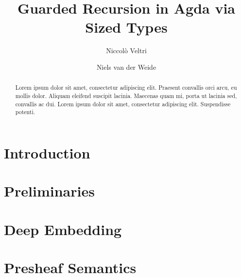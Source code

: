\documentclass[a4paper,UKenglish,cleveref, autoref,numberwithinsect]{lipics-v2019}
\title{Guarded Recursion in Agda via Sized Types}
\author{Niccol\`o Veltri}{Department of Computer Science, IT
  University of Copenhagen, Denmark}{nive@itu.dk}{[orcid]}{[funding]}
\author{Niels van der Weide}{iCIS, Radboud University, The Netherlands}{nweide@cs.ru.nl}{[orcid]}{}
\begin{document}
\maketitle

\begin{abstract}
Lorem ipsum dolor sit amet, consectetur adipiscing elit. Praesent convallis orci arcu, eu mollis dolor. Aliquam eleifend suscipit lacinia. Maecenas quam mi, porta ut lacinia sed, convallis ac dui. Lorem ipsum dolor sit amet, consectetur adipiscing elit. Suspendisse potenti. 
 \end{abstract}

\section{Introduction}
\label{sec:intro}

\nocite{*}

\section{Preliminaries}
\label{sec:prelim}



\section{Deep Embedding}
\label{sec:syntax}


\section{Presheaf Semantics}
\label{sec:presheaf_sem}
\end{document}
